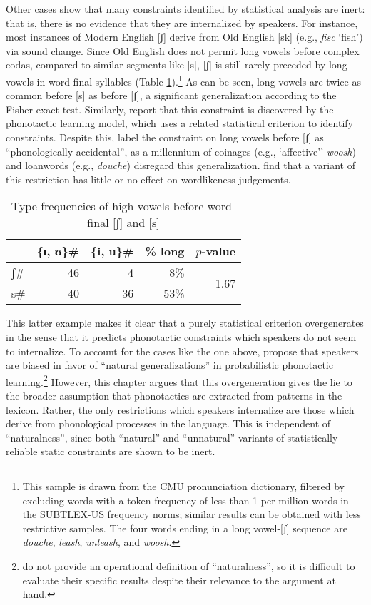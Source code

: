 Other cases show that many constraints identified by statistical analysis are inert: that is, there is no evidence that they are internalized by speakers.
For instance, most instances of Modern English [ʃ] derive from Old English [sk] (e.g., \emph{fisc} `fish') via sound change.
Since Old English does not permit long vowels before complex codas, compared to similar segments like [s], [ʃ] is still rarely preceded by long vowels in word-final syllables (Table \ref{ssh}).\footnote{
    This sample is drawn from the CMU pronunciation dictionary, filtered by excluding words with a token frequency of less than 1 per million words in the SUBTLEX-US frequency norms; similar results can be obtained with less restrictive samples.
    The four words ending in a long vowel-[ʃ] sequence are \emph{douche}, \emph{leash}, \emph{unleash}, and \emph{woosh}.}
As can be seen, long vowels are twice as common before [s] as before [ʃ], a significant generalization according to the Fisher exact test.
Similarly, \citet{HayesInPress} report that this constraint is discovered by the \citet{Hayes2008a} phonotactic learning model, which uses a related statistical criterion to identify constraints.
Despite this, \citet{Iverson2005} label the constraint on long vowels before [ʃ] as ``phonologically accidental'', as a millennium of coinages (e.g., 
`affective'' \emph{woosh}) and loanwords (e.g., \emph{douche}) disregard this generalization.
\citet{HayesInPress} find that a variant of this restriction has little or no effect on wordlikeness judgements.

\begin{table}[t]
\centering
\begin{tabular}{l r r r r}
\toprule
          & \{ɪ, ʊ\}\gap{}\# & \{i, u\}\gap{}\# & \% long & $p$-value \\
\midrule
\gap{}ʃ\# & 46               & 4                & 8\%     & \multirow{2}{*}{1.67\e{-06}} \\
\gap{}s\# & 40               & 36               & 53\%    & \\
\bottomrule
\end{tabular}
\caption{Type frequencies of high vowels before word-final [ʃ] and [s]}
\label{ssh}
\end{table}

This latter example makes it clear that a purely statistical criterion overgenerates in the sense that it predicts phonotactic constraints which speakers do not seem to internalize.
To account for the cases like the one above, \citet{HayesInPress} propose that speakers are biased in favor of ``natural generalizations'' in probabilistic phonotactic learning.\footnote{
    \citeauthor{HayesInPress} do not provide an operational definition of ``naturalness'', so it is difficult to evaluate their specific results despite their relevance to the argument at hand.}
However, this chapter argues that this overgeneration gives the lie to the broader assumption that phonotactics are extracted from patterns in the lexicon.
Rather, the only restrictions which speakers internalize are those which derive from phonological processes in the language.
This is independent of ``naturalness'', since both ``natural'' and ``unnatural'' variants of statistically reliable static constraints are shown to be inert.

